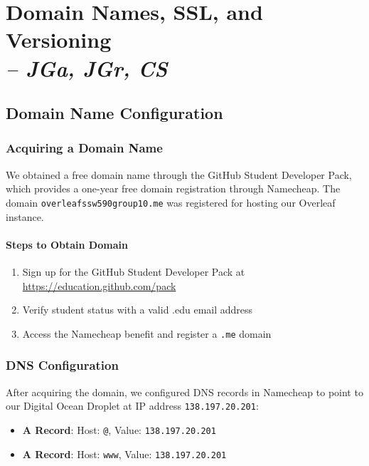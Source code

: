 \chapter[Domain Names, SSL, and Versioning]{Domain Names, SSL, and Versioning \\
\small{\textit{-- JGa, JGr, CS}}
\label{Chapter::DNsSSLVersioning}}

\section{Domain Name Configuration}

\subsection{Acquiring a Domain Name}

We obtained a free domain name through the GitHub Student Developer Pack, which provides a one-year free domain registration through Namecheap. The domain \texttt{overleafssw590group10.me} was registered for hosting our Overleaf instance.

\subsubsection{Steps to Obtain Domain}

\begin{enumerate}
    \item Sign up for the GitHub Student Developer Pack at \url{https://education.github.com/pack}
    \item Verify student status with a valid .edu email address
    \item Access the Namecheap benefit and register a \texttt{.me} domain
\end{enumerate}

\subsection{DNS Configuration}

After acquiring the domain, we configured DNS records in Namecheap to point to our Digital Ocean Droplet at IP address \texttt{138.197.20.201}:

\begin{itemize}
    \item \textbf{A Record}: Host: \texttt{@}, Value: \texttt{138.197.20.201}
    \item \textbf{A Record}: Host: \texttt{www}, Value: \texttt{138.197.20.201}
\end{itemize}

